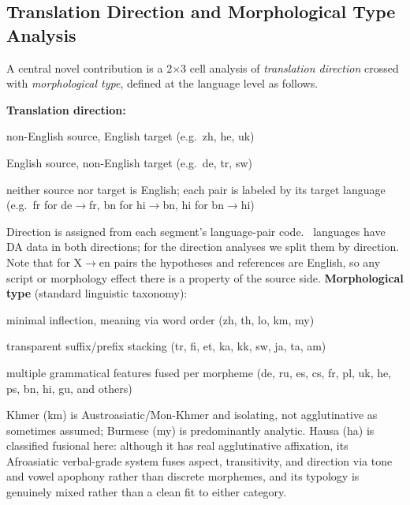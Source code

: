 \documentclass[11pt]{article}
\begin{document}
\subsection{Translation Direction and Morphological Type Analysis}
\label{sec:dir_morph}

A central novel contribution is a 2$\times$3 cell analysis of \emph{translation direction} crossed with \emph{morphological type}, defined at the language level as follows.

\vspace{0.3em}
\noindent\textbf{Translation direction:}
\begin{description}[noitemsep,topsep=2pt]
  \item[X$\to$en] non-English source, English target (e.g.\ zh, he, uk)
  \item[en$\to$X] English source, non-English target (e.g.\ de, tr, sw)
  \item[X$\leftrightarrow$Y] neither source nor target is English; each pair is labeled by its target language (e.g.\ fr for de$\to$fr, bn for hi$\to$bn, hi for bn$\to$hi)
\end{description}
Direction is assigned from each segment's language-pair code. \NumMixedLangs\ languages have DA data in both directions; for the direction analyses we split them by direction. Note that for X$\to$en pairs the hypotheses and references are English, so any script or morphology effect there is a property of the source side.
\vspace{0.3em}
\noindent\textbf{Morphological type} (standard linguistic taxonomy):
\begin{description}[noitemsep,topsep=2pt]
  \item[isolating] minimal inflection, meaning via word order (zh, th, lo, km, my)
  \item[agglutinative] transparent suffix/prefix stacking (tr, fi, et, ka, kk, sw, ja, ta, am)
  \item[fusional] multiple grammatical features fused per morpheme (de, ru, es, cs, fr, pl, uk, he, ps, bn, hi, gu, and others)
\end{description}
\vspace{0.3em}

Khmer (km) is Austroasiatic/Mon-Khmer and isolating, not agglutinative as sometimes assumed; Burmese (my) is predominantly analytic. Hausa (ha) is classified fusional here: although it has real agglutinative affixation, its Afroasiatic verbal-grade system fuses aspect, transitivity, and direction via tone and vowel apophony rather than discrete morphemes, and its typology is genuinely mixed rather than a clean fit to either category.
\end{document}
